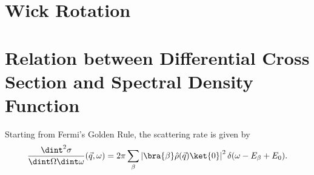 \documentclass[a4paper,12pt]{report}
\begin{document}
\section{Wick Rotation}

\section{Relation between Differential Cross Section and Spectral Density Function}


Starting from Fermi's Golden Rule, the scattering rate is given by 
\begin{equation} \label{FGR}
 \frac{\dint^2 \sigma}{\dint \Omega \dint \omega}(\vec q, \omega) = 2\pi \sum_{\beta} \left| \bra{\beta} \hat \rho(\vec q) \ket{0}\right|^2 \delta(\omega - E_{\beta}+E_0).
\end{equation}



\end{document}
